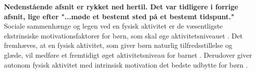\textbf{Nedenstående afsnit er rykket ned hertil. Det var tidligere i forrige afsnit, lige efter "...møde et bestemt sted på et bestemt tidspunt."}\newline
Sociale sammenhænge og legen ved en fysisk aktivitet er de væsentligste ekstrinsiske motivationsfaktorer for børn, som skal øge aktivitetsniveauet \citep{McWhorter2003,J.Sebire2013}. Det fremhæves, at en fysisk aktivitet, som giver børn naturlig tilfredsstillelse og glæde, vil medføre et fremtidigt øget aktivitetsniveau for barnet \citep{Romani2013}. Derudover giver autonom fysisk aktivitet med intrinsisk motivation det bedste udbytte for børn \citep{J.Sebire2013}.


